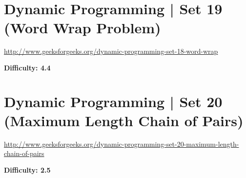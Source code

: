 \section{Dynamic Programming | Set 19 (Word Wrap Problem)
  \label{secGFGDPSet19WordWrapProb}}

\url{http://www.geeksforgeeks.org/dynamic-programming-set-18-word-wrap}

\textbf{Difficulty: 4.4}

\textbf{}

\RayNotesBegin



\RayNotesEnd

\textbf{}



\section{Dynamic Programming | Set 20 (Maximum Length Chain of Pairs)
  \label{secGFGDPSet20MaxLenChainPairs}}

\url{http://www.geeksforgeeks.org/dynamic-programming-set-20-maximum-length-chain-of-pairs}

\textbf{Difficulty: 2.5}

\textbf{}

\RayNotesBegin



\RayNotesEnd

\textbf{}


